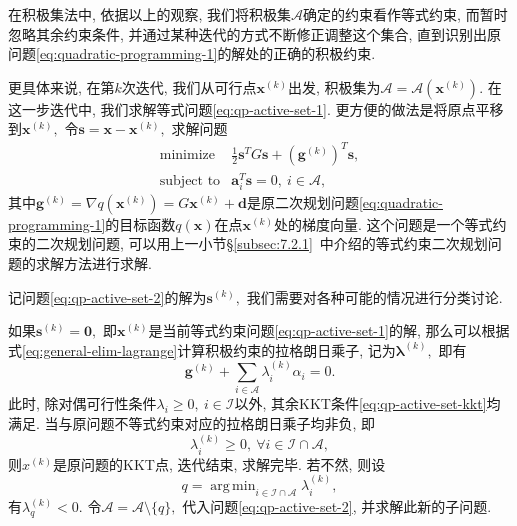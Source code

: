 \documentclass{SBCbookchapter}
\newcommand{\V}[1]{{\bm{#1}}}
\DeclareMathOperator*{\argmin}{arg\,min}
\numberwithin{equation}{section}
\begin{document}
在积极集法中, 依据以上的观察, 我们将积极集$\mathcal{A}$确定的约束看作等式约束, 而暂时忽略其余约束条件, 并通过某种迭代的方式不断修正调整这个集合, 直到识别出原问题\eqref{eq:quadratic-programming-1}的解处的正确的积极约束.

更具体来说, 在第$k$次迭代, 我们从可行点$\V{x}^{(k)}$出发, 积极集为$\mathcal{A} = \mathcal{A}(\V{x}^{(k)}).$ 在这一步迭代中, 我们求解等式问题\eqref{eq:qp-active-set-1}. 更方便的做法是将原点平移到$\V{x}^{(k)},$ 令$\V{s} = \V{x} - \V{x}^{(k)},$ 求解问题
\begin{equation}
\label{eq:qp-active-set-2}
\begin{array}{cl}
\text{minimize} & \frac{1}{2} \V{s}^T G \V{s} + \left( \V{g}^{(k)} \right)^T \V{s}, \\
\text{subject to} & \V{a}_i^T \V{s} = 0, ~ i \in \mathcal{A},
\end{array}
\end{equation}
其中$\V{g}^{(k)} = \nabla q(\V{x}^{(k)}) = G \V{x}^{(k)} + \V{d}$是原二次规划问题\eqref{eq:quadratic-programming-1}的目标函数$q(\V{x})$在点$\V{x}^{(k)}$处的梯度向量. 这个问题是一个等式约束的二次规划问题, 可以用上一小节\S\ref{subsec:7.2.1}~中介绍的等式约束二次规划问题的求解方法进行求解.

记问题\eqref{eq:qp-active-set-2}的解为$\V{s}^{(k)},$ 我们需要对各种可能的情况进行分类讨论.

如果$\V{s}^{(k)} = \V{0},$ 即$\V{x}^{(k)}$是当前等式约束问题\eqref{eq:qp-active-set-1}的解, 那么可以根据式\eqref{eq:general-elim-lagrange}计算积极约束的拉格朗日乘子, 记为$\V{\lambda}^{(k)},$ 即有
\begin{equation}
\label{eq:qp-active-set-lambda}
\V{g}^{(k)} + \sum\limits_{i \in \mathcal{A}} \lambda_i^{(k)} \alpha_i = 0.
\end{equation}
此时, 除对偶可行性条件$\lambda_i \geqslant 0, ~ i \in \mathcal{I}$以外, 其余KKT条件\eqref{eq:qp-active-set-kkt}均满足. 当与原问题不等式约束对应的拉格朗日乘子均非负, 即
\begin{equation*}
\lambda_i^{(k)} \geqslant 0, ~ \forall i \in \mathcal{I} \cap \mathcal{A},
\end{equation*}
则$x^{(k)}$是原问题的KKT点, 迭代结束, 求解完毕. 若不然, 则设
\begin{equation}
\label{eq:qp-active-set-inactive-index}
q = \argmin_{i \in \mathcal{I} \cap \mathcal{A}} \lambda_i^{(k)},
\end{equation}
有$\lambda_q^{(k)} < 0.$ 令$\mathcal{A} = \mathcal{A} \setminus \{ q \},$ 代入问题\eqref{eq:qp-active-set-2}, 并求解此新的子问题.
\end{document}
